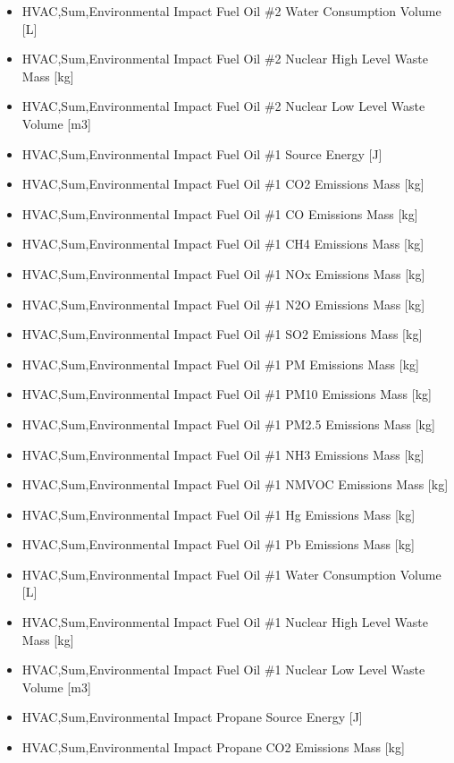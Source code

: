 \begin{itemize}
\item
  HVAC,Sum,Environmental Impact Fuel Oil \#2 Water Consumption Volume {[}L{]}
\item
  HVAC,Sum,Environmental Impact Fuel Oil \#2 Nuclear High Level Waste Mass {[}kg{]}
\item
  HVAC,Sum,Environmental Impact Fuel Oil \#2 Nuclear Low Level Waste Volume {[}m3{]}
\item
  HVAC,Sum,Environmental Impact Fuel Oil \#1 Source Energy {[}J{]}
\item
  HVAC,Sum,Environmental Impact Fuel Oil \#1 CO2 Emissions Mass {[}kg{]}
\item
  HVAC,Sum,Environmental Impact Fuel Oil \#1 CO Emissions Mass {[}kg{]}
\item
  HVAC,Sum,Environmental Impact Fuel Oil \#1 CH4 Emissions Mass {[}kg{]}
\item
  HVAC,Sum,Environmental Impact Fuel Oil \#1 NOx Emissions Mass {[}kg{]}
\item
  HVAC,Sum,Environmental Impact Fuel Oil \#1 N2O Emissions Mass {[}kg{]}
\item
  HVAC,Sum,Environmental Impact Fuel Oil \#1 SO2 Emissions Mass {[}kg{]}
\item
  HVAC,Sum,Environmental Impact Fuel Oil \#1 PM Emissions Mass {[}kg{]}
\item
  HVAC,Sum,Environmental Impact Fuel Oil \#1 PM10 Emissions Mass {[}kg{]}
\item
  HVAC,Sum,Environmental Impact Fuel Oil \#1 PM2.5 Emissions Mass {[}kg{]}
\item
  HVAC,Sum,Environmental Impact Fuel Oil \#1 NH3 Emissions Mass {[}kg{]}
\item
  HVAC,Sum,Environmental Impact Fuel Oil \#1 NMVOC Emissions Mass {[}kg{]}
\item
  HVAC,Sum,Environmental Impact Fuel Oil \#1 Hg Emissions Mass {[}kg{]}
\item
  HVAC,Sum,Environmental Impact Fuel Oil \#1 Pb Emissions Mass {[}kg{]}
\item
  HVAC,Sum,Environmental Impact Fuel Oil \#1 Water Consumption Volume {[}L{]}
\item
  HVAC,Sum,Environmental Impact Fuel Oil \#1 Nuclear High Level Waste Mass {[}kg{]}
\item
  HVAC,Sum,Environmental Impact Fuel Oil \#1 Nuclear Low Level Waste Volume {[}m3{]}
\item
  HVAC,Sum,Environmental Impact Propane Source Energy {[}J{]}
\item
  HVAC,Sum,Environmental Impact Propane CO2 Emissions Mass {[}kg{]}

\end{itemize}
